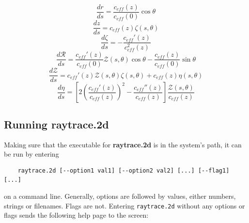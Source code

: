 \begin{equation}
\frac{dr}{ds}=\frac{c_{eff}(z)}{c_{eff}(0)}\cos\theta
\label{eq: 2d-drds}
\end{equation}
\begin{equation}
\frac{dz}{ds}=c_{eff}(z)\zeta(s,\theta)
\label{eq: 2d-dzds}
\end{equation}
\begin{equation}
\frac{d\zeta}{ds}=-\frac{c_{eff}'(z)}{c_{eff}^2(z)}
\label{eq: 2d-dzetads}
\end{equation}
\begin{equation}
\frac{d\mathcal{R}}{ds}=\frac{c_{eff}'(z)}{c_{eff}(0)} \mathcal{Z}(s,\theta)\cos\theta - \frac{c_{eff}(z)}{c_{eff}(0)}\sin\theta
\label{eq: 2d-dRds}
\end{equation}
\begin{equation}
\frac{d\mathcal{Z}}{ds}=c_{eff}'(z)\mathcal{Z}(s,\theta)\zeta(s,\theta) + c_{eff}(z)\eta(s,\theta)
\label{eq: 2d-dZds}
\end{equation}
\begin{equation}
\frac{d\eta}{ds}=\left[2\left(\frac{c_{eff}'(z)}{c_{eff}(z)}\right)^2 - \frac{c_{eff}''(z)}{c_{eff}(z)}\right]\frac{\mathcal{Z}(s,\theta)}{c_{eff}(z)}
\label{eq: 2d-detads}
\end{equation}


\subsection{Running raytrace.2d}
\label{sec: raytrace.2d running}

Making sure that the executable for {\bf raytrace.2d} is in the system's path, it can be run by entering 
\begin{verbatim} 
    raytrace.2d [--option1 val1] [--option2 val2] [...] [--flag1] [...] 
\end{verbatim}
on a command line. Generally, options are followed by values, either numbers, strings or filenames. Flags are not. Entering \verb"raytrace.2d" without any options or flags sends the following help page to the screen: 

